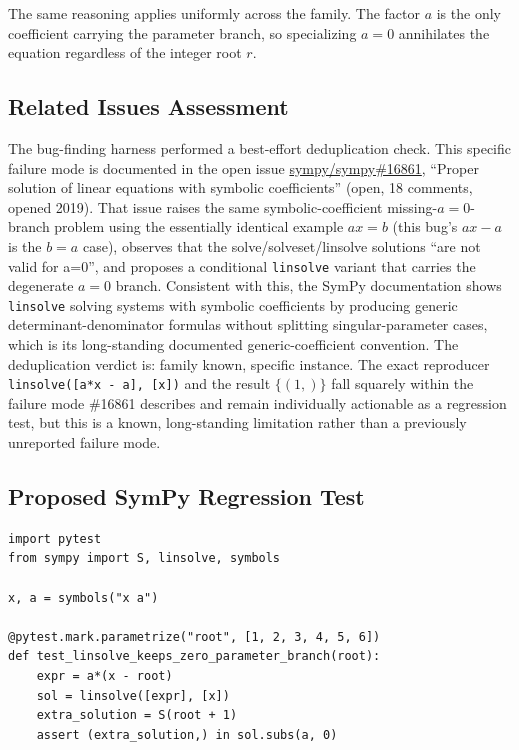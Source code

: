\documentclass[11pt]{article}
\begin{document}
The same reasoning applies uniformly across the family.  The factor \(a\) is
the only coefficient carrying the parameter branch, so specializing \(a=0\)
annihilates the equation regardless of the integer root \(r\).

\subsection{Related Issues Assessment}

The bug-finding harness performed a best-effort deduplication check.  This
specific failure mode is documented in the open issue
\href{https://github.com/sympy/sympy/issues/16861}{sympy/sympy\#16861},
``Proper solution of linear equations with symbolic coefficients'' (open, 18
comments, opened 2019).  That issue raises the same symbolic-coefficient
missing-\(a=0\)-branch problem using the essentially identical example
\(a x = b\) (this bug's \(a x - a\) is the \(b=a\) case), observes that the
solve/solveset/linsolve solutions ``are not valid for a=0'', and proposes a
conditional \texttt{linsolve} variant that carries the degenerate \(a=0\)
branch.  Consistent with this, the SymPy documentation shows
\texttt{linsolve} solving systems with symbolic coefficients by producing
generic determinant-denominator formulas without splitting singular-parameter
cases, which is its long-standing documented generic-coefficient convention.
The deduplication verdict is: family known, specific instance.  The exact
reproducer \texttt{linsolve([a*x - a], [x])} and the result \(\{(1,)\}\) fall
squarely within the failure mode \#16861 describes and remain individually
actionable as a regression test, but this is a known, long-standing limitation
rather than a previously unreported failure mode.

\subsection{Proposed SymPy Regression Test}

\medskip

\begin{lstlisting}[style=bugpython]
import pytest
from sympy import S, linsolve, symbols

x, a = symbols("x a")

@pytest.mark.parametrize("root", [1, 2, 3, 4, 5, 6])
def test_linsolve_keeps_zero_parameter_branch(root):
    expr = a*(x - root)
    sol = linsolve([expr], [x])
    extra_solution = S(root + 1)
    assert (extra_solution,) in sol.subs(a, 0)
\end{lstlisting}
\end{document}
